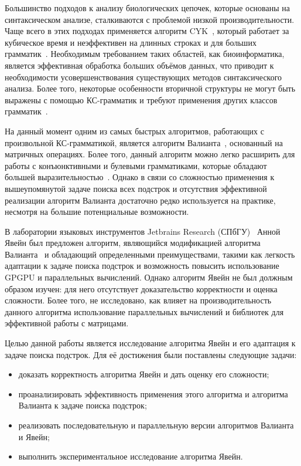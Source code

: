 Большинство подходов к анализу биологических цепочек, которые основаны на синтаксическом анализе, сталкиваются с проблемой низкой производительности.
Чаще всего в этих подходах применяется алгоритм CYK~\cite{kasami1966efficient, Younger:1966:CLP:1441427.1442019}, который работает за кубическое время и неэффективен на длинных строках и для больших грамматик~\cite{liu2005parallel}.
Необходимым требованием таких областей, как биоинформатика, является эффективная обработка больших объёмов данных, что приводит к необходимости усовершенствования существующих методов синтаксического анализа.
Более того, некоторые особенности вторичной структуры не могут быть выражены с помощью КС-грамматик и требуют применения других классов грамматик~\cite{zier2013rna}.

На данный момент одним из самых быстрых алгоритмов, работающих с произвольной КС-грамматикой, является алгоритм Валианта~\cite{Valiant:1975:GCR:1739932.1740048}, основанный на матричных операциях.
Более того, данный алгоритм можно легко расширить для работы с конъюнктивными и булевыми грамматиками, которые обладают большей выразительностью~\cite{Okhotin:2014:PMM:2565359.2565379}.
Однако в связи со сложностью  применения к вышеупомянутой задаче поиска всех подстрок и отсутствия эффективной реализации алгоритм Валианта достаточно редко используется на практике, несмотря на большие потенциальные возможности.

В лаборатории языковых инструментов Jetbrains Research (СПбГУ)~\cite{jetbrains} Анной Явейн был предложен алгоритм, являющийся модификацией алгоритма Валианта~\cite{alg} и обладающий определенными преимуществами, такими как легкость адаптации к задаче поиска подстрок и возможность повысить использование GPGPU и параллельных вычислений.
Однако алгоритм Явейн не был должным образом изучен: для него отсутствует доказательство корректности и оценка сложности.
Более того, не исследовано, как влияет на производительность данного алгоритма использование параллельных вычислений и библиотек для эффективной работы с матрицами.

Целью данной работы является исследование алгоритма Явейн и его адаптация к задаче поиска подстрок.
Для её достижения были поставлены следующие задачи:

\begin{itemize}
	\item доказать корректность алгоритма Явейн и дать оценку его сложности;
	\item проанализировать эффективность применения этого алгоритма и алгоритма Валианта к задаче поиска подстрок;
	\item реализовать последовательную и параллельную версии алгоритмов Валианта и Явейн;
	\item выполнить экспериментальное исследование алгоритма Явейн.
\end{itemize}


